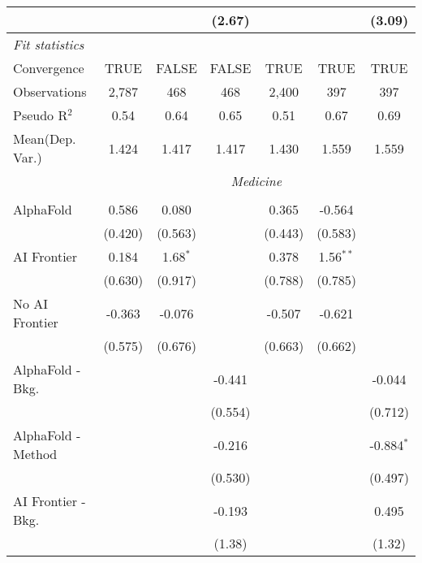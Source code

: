 \begin{tabular}{lcccccc}
                           &              &             & (2.67)      &              &             & (3.09)\\   
   \midrule
   \emph{Fit statistics}\\
   Convergence             &TRUE          & FALSE       & FALSE       & TRUE         & TRUE        & TRUE\\  
   Observations            & 2,787        & 468         & 468         & 2,400        & 397         & 397\\  
   Pseudo R$^2$            & 0.54         & 0.64        & 0.65        & 0.51         & 0.67        & 0.69\\  
   
Mean(Dep. Var.) & 1.424 & 1.417 & 1.417 & 1.430 & 1.559 & 1.559 \\
 & \multicolumn{6}{c}{\textit{Medicine}} \\ \\
   AlphaFold               & 0.586   & 0.080      &             & 0.365   & -0.564      &   \\   
                           & (0.420) & (0.563)    &             & (0.443) & (0.583)     &   \\   
   AI Frontier             & 0.184   & 1.68$^{*}$ &             & 0.378   & 1.56$^{**}$ &   \\   
                           & (0.630) & (0.917)    &             & (0.788) & (0.785)     &   \\   
   No AI Frontier          & -0.363  & -0.076     &             & -0.507  & -0.621      &   \\   
                           & (0.575) & (0.676)    &             & (0.663) & (0.662)     &   \\   
   AlphaFold - Bkg.        &         &            & -0.441      &         &             & -0.044\\   
                           &         &            & (0.554)     &         &             & (0.712)\\   
   AlphaFold - Method      &         &            & -0.216      &         &             & -0.884$^{*}$\\   
                           &         &            & (0.530)     &         &             & (0.497)\\   
   AI Frontier - Bkg.      &         &            & -0.193      &         &             & 0.495\\   
                           &         &            & (1.38)      &         &             & (1.32)\\   

\end{tabular}
